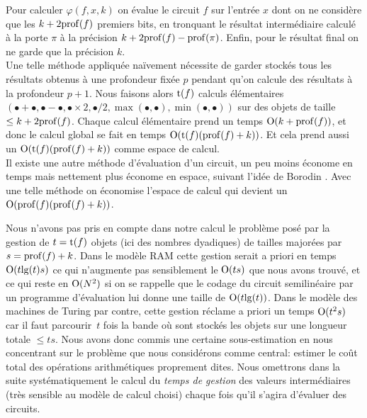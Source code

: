 \proof 
Pour calculer  $\varphi (f,x,k)$  on évalue le circuit $f$ sur l'entrée $x$ 
dont on ne considère que les  $k + 2 {\rm prof}(f)$  premiers bits, en tronquant le 
résultat intermédiaire calculé à la porte  $\pi$ à la précision  
$k+2{\rm prof}(f)-{\rm prof}(\pi)$.  Enfin, pour le résultat final on ne garde que la 
précision  $k$.\\
Une telle méthode appliquée naïvement nécessite de garder stockés 
tous les résultats obtenus à une profondeur fixée  $p$  pendant qu'on 
calcule des résultats à la profondeur  $p+1$.
Nous faisons alors  ${\rm t}(f)$  calculs élémentaires  $(\bullet + \bullet, 
\bullet - \bullet,\bullet \times 2, \bullet/2, \max(\bullet, \bullet),
\min(\bullet, \bullet))$  
sur des objets de taille $\leq  k + 2 {\rm prof}(f)$.  Chaque calcul élémentaire 
prend un temps ${\rm O}(k+{\rm prof}(f))$, et donc le calcul global se fait en temps  
${\rm O}({\rm t}(f)({\rm prof}(f)+k))$.  Et cela prend aussi un ${\rm O}({\rm t}(f)({\rm prof}(f)+k))$ comme 
espace de calcul.\\  
Il existe une autre méthode d'évaluation d'un circuit, un peu moins 
économe en temps mais nettement plus économe en espace, suivant l'idée de 
Borodin \cite{fBo}. Avec une telle méthode on économise l'espace de calcul 
qui devient un  ${\rm O}({\rm prof}(f)({\rm prof}(f)+k))$.
\eop

\begin{fremark} \label{f323}
Nous n'avons pas pris en compte dans notre calcul le problème posé par la 
gestion de  $t = {\rm t}(f)$  objets (ici des nombres dyadiques) de tailles 
majorées par  $s = {\rm prof}(f)+k$. Dans le modèle RAM cette gestion serait a 
priori en temps   ${\rm O}(t {\rm lg}(t) s)$  ce qui n'augmente pas 
sensiblement le  ${\rm O}(t s)$  que nous avons trouvé, et ce qui reste en  
${\rm O}(N^2)$  si on se rappelle que le codage du circuit semilinéaire par un 
programme d'évaluation lui donne une taille de ${\rm O}(t {\rm lg}(t))$. Dans le 
modèle des machines de Turing par contre, cette gestion réclame a priori un 
temps  ${\rm O}(t^2s)$  car il faut parcourir~$t$ fois la bande où sont stockés 
les objets sur une longueur totale  $\leq  ts$. Nous avons donc commis une 
certaine sous-estimation en nous concentrant sur le problème que nous 
considérons comme central: estimer le coût total des 
opérations arithmétiques proprement dites. Nous omettrons dans la suite 
systématiquement le calcul du {\em temps de gestion} des valeurs 
intermédiaires (très sensible au modèle de calcul choisi) chaque fois 
qu'il s'agira d'évaluer des circuits.
\end{fremark}

